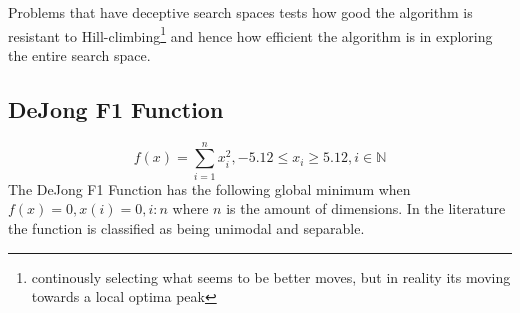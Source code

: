 Problems that have deceptive search spaces tests how good the algorithm is resistant to Hill-climbing\footnote{continously selecting what seems to be better moves, but in reality its moving towards a local optima peak} and hence how efficient the algorithm is in exploring the entire search space\cite{evalevoalgo}.
\subsection{DeJong F1 Function}
\begin{equation}
\label{eq:DeJongF1}
	f(x) = \sum_{i=1}^n x^2_i, -5.12 \leq x_i \geq 5.12, i \in \mathbb{N}
\end{equation}
The DeJong F1 Function has the following global minimum when $f(x) = 0, x(i) = 0, i:n$ where $n$ is the amount of dimensions\cite{numericalABC,ABCCompareStudy,ARPSO,PerfABC,ContinACSTS,TestFunctions}. In the literature the function is classified as being unimodal and separable\cite{ABCCompareStudy,TestFunctions}. 

